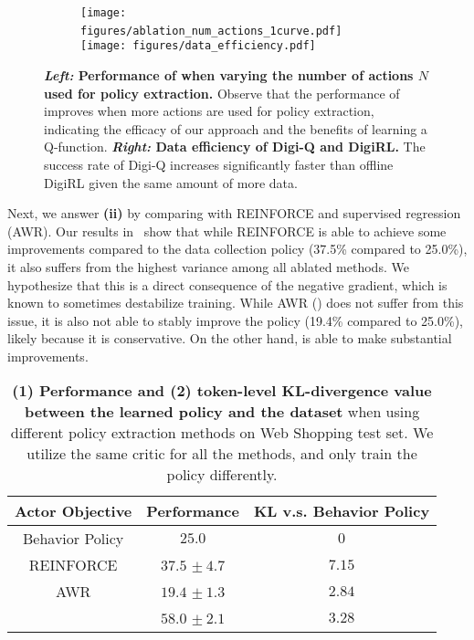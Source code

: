 \begin{figure}[!t]
     \centering
    \begin{subfigure}[b]{0.95\linewidth}
         \centering
    \texttt{[image: figures/ablation\_num\_actions\_1curve.pdf]}~~~~\vline~~ 
    \texttt{[image: figures/data\_efficiency.pdf]}
     \end{subfigure}
        \caption{\footnotesize{ \textbf{\textit{Left: }Performance of \ourmethod{} when varying the number of actions $N$ used for policy extraction.} Observe that the performance of \ourmethod{} improves when more actions are used for policy extraction, indicating the efficacy of our approach and the benefits of learning a Q-function.} \textbf{\textit{Right:} Data efficiency of Digi-Q and DigiRL.} The success rate of Digi-Q increases significantly faster than offline DigiRL given the same amount of more data.}
        \label{fig:ablation-n-actions}
\end{figure}

Next, we answer \textbf{(ii)} by comparing  \ourmethod{} with REINFORCE and supervised regression (AWR). Our results in~ show that while REINFORCE is able to achieve some improvements compared to the data collection policy (37.5\% compared to 25.0\%), it also suffers from the highest variance among all ablated methods. We hypothesize that this is a direct consequence of the negative gradient, which is known to sometimes destabilize training.  While AWR (\citet{bai2024digirltraininginthewilddevicecontrol}) does not suffer from this issue, it is also not able to stably improve the policy (19.4\% compared to 25.0\%), likely because it is conservative. On the other hand, \ourmethod{} is able to make substantial improvements. 

\begin{table}[!htp]
    \centering
    \setlength{\tabcolsep}{5.0pt}
        \begin{tabular}{ccc}
\toprule
\textbf{Actor Objective} & \textbf{Performance} & \textbf{KL v.s. Behavior Policy} \\ 
\midrule
Behavior Policy & $25.0$ & $0$ \\
\hdashline
\rule{0pt}{2.5ex}
REINFORCE & $37.5$ \scriptsize{$ \pm\ 4.7$} & $7.15$ \\
AWR & $19.4$ \scriptsize{$ \pm\ 1.3$} & $2.84$ \\
\hdashline
\rule{0pt}{2.5ex}
\ourmethod{} & $\mathbf{58.0}$ \scriptsize{$ \pm\ \mathbf{2.1}$} & $3.28$ \\
\bottomrule
        \end{tabular}
        \caption{\footnotesize{\textbf{(1) Performance and (2) token-level KL-divergence value between the learned policy and the dataset} when using different policy extraction methods on Web Shopping test set. We utilize the same critic for all the methods, and only train the policy differently.}}
        \label{tab:exp-actor-loss}
\end{table}

